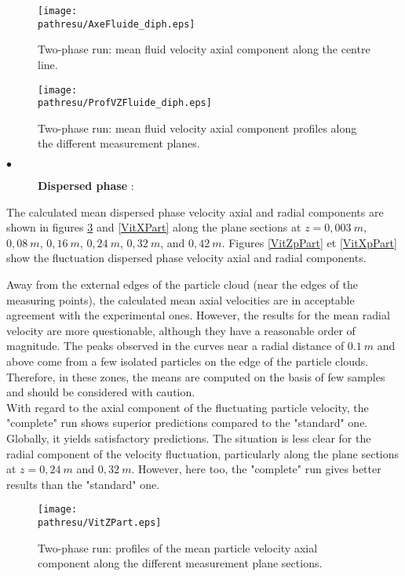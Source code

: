 \documentclass[a4paper,twoside,12pt]{article}
\newcommand{\pathresu}{./FIGURES}
\begin{document}
\begin{figure}[h]
   \centerline{\texttt{[image: \\pathresu/AxeFluide\_diph.eps]}}
   \caption{Two-phase run: mean fluid velocity axial component along the centre line.}
   \label{AxeFluide_diph}
\end{figure}

\begin{figure}[h]
   \centerline{\texttt{[image: \\pathresu/ProfVZFluide\_diph.eps]}}
   \caption{Two-phase run: mean fluid velocity axial component profiles along the different measurement planes.}
   \label{ProfVZFluide_diph}
\end{figure}

\begin{description}
   \item[$\bullet$] \textbf{Dispersed phase} :
\end{description}
\noindent

The calculated mean dispersed phase velocity axial and radial components are shown in figures \ref{VitZPart} and \ref{VitXPart} along the plane sections at $z = 0,003~m$, $0,08~m$, $0,16~m$, $0,24~m$, $0,32~m$, and $0,42~m$.
Figures \ref{VitZpPart} et \ref{VitXpPart} show the fluctuation dispersed phase velocity axial and radial components.

\noindent
Away from the external edges of the particle cloud (near the edges of the measuring points), the calculated mean axial velocities are in acceptable agreement with the experimental ones. However, the results for the mean radial velocity are more questionable, although they have a reasonable order of magnitude. The peaks observed in the curves near a radial distance of $0.1~m$ and above come from a few isolated particles on the edge of the particle clouds. Therefore, in these zones, the means are computed on the basis of few samples and should be considered with caution. \\ With regard to the axial component of the fluctuating particle velocity, the "complete" run shows superior predictions compared to the "standard" one. Globally, it yields satisfactory predictions. The situation is less clear for the radial component of the velocity fluctuation, particularly along the plane sections at $z = 0,24~m$ and $0,32~m$. However, here too, the "complete" run gives better results than the "standard" one.

\noindent

\begin{figure}[h]
   \centerline{\texttt{[image: \\pathresu/VitZPart.eps]}}
   \caption{Two-phase run: profiles of the mean particle velocity axial component along the different measurement plane sections.}
   \label{VitZPart}
\end{figure}
\end{document}
